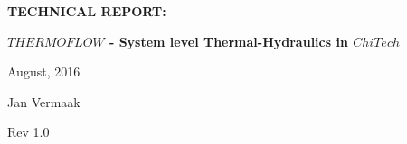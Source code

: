 \documentclass[11pt,letterpaper,titlepage]{article}
\begin{document}
\newcommand{\NSCDOCNUMBR}{NSC-REP-15-X}         %
\newcommand{\NSCDOCSUBJT}{TECHNICAL REPORT: }   %
\newcommand{\NSCDOCTITLE}{$THERMOFLOW$ - System level Thermal-Hydraulics in $ChiTech$}       %
\newcommand{\NSCDOCDATE} {August, 2016}    %
\newcommand{\NSCDOCREV}  {Rev 1.0} %



\begin{titlepage}
	\pagestyle{fancy}
	\vspace*{1.0cm}
	\centering
	\vspace{1cm}
	\vspace{.25cm}
	{\Large\bfseries  \NSCDOCSUBJT \par} 
	{\Large\bfseries \NSCDOCTITLE  \par}
	\vspace{1cm}
	{\Large \NSCDOCDATE \par}
	\vspace{1.0cm}
	{\Large Jan Vermaak \par}
	{\Large \NSCDOCREV \par}
		

	\begin{center}
		\begin{minipage}[c]{0.45\textwidth}
			\begin{figure}[H]
			

\end{figure}
\end{minipage}
\end{center}
\end{titlepage}
\end{document}
